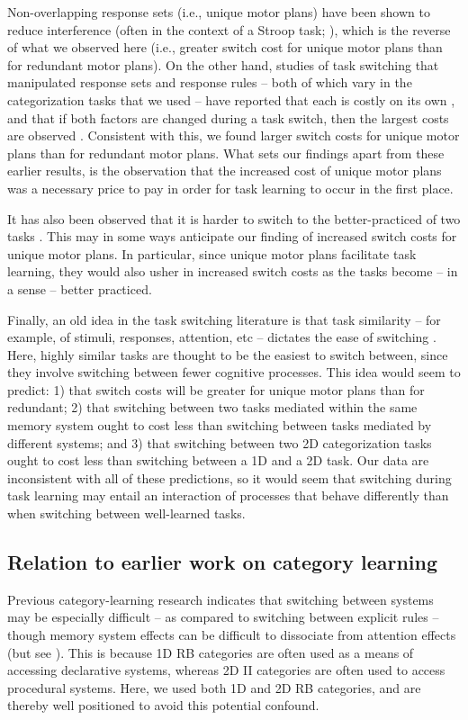 \documentclass[doc, floatsintext]{apa7}
\begin{document}
Non-overlapping response sets (i.e., unique motor plans)
have been shown to reduce interference (often in the context
of a Stroop task; \cite{klein_semantic_1964, mayr_age_2001,
redding_stroop_1977, yeung_switching_2003}), which is the
reverse of what we observed here (i.e., greater switch cost
for unique motor plans than for redundant motor plans). On
the other hand, studies of task switching that manipulated
response sets and response rules -- both of which vary in
the categorization tasks that we used -- have reported that
each is costly on its own \parencite{philipp_role_2011,
philipp_differential_2013}, and that if both factors are
changed during a task switch, then the largest costs are
observed \parencite{philipp_integration_2010}. Consistent
with this, we found larger switch costs for unique motor
plans than for redundant motor plans. What sets our findings
apart from these earlier results, is the observation that
the increased cost of unique motor plans was a necessary
price to pay in order for task learning to occur in the
first place.

It has also been observed that it is harder to switch to the
better-practiced of two tasks
\parencite{allport_shifting_1994, yeung_switching_2003}.
This may in some ways anticipate our finding of increased
switch costs for unique motor plans. In particular, since
unique motor plans facilitate task learning, they would also
usher in increased switch costs as the tasks become -- in a
sense -- better practiced.

Finally, an old idea in the task switching literature is
that task similarity -- for example, of stimuli, responses,
attention, etc -- dictates the ease of switching
\parencite{arrington_tasks_2003}. Here, highly similar tasks
are thought to be the easiest to switch between, since they
involve switching between fewer cognitive processes.  This
idea would seem to predict: 1) that switch costs will be
greater for unique motor plans than for redundant; 2) that
switching between two tasks mediated within the same memory
system ought to cost less than switching between tasks
mediated by different systems; and 3) that switching between
two 2D categorization tasks ought to cost less than
switching between a 1D and a 2D task. Our data are
inconsistent with all of these predictions, so it would seem
that switching during task learning may entail an
interaction of processes that behave differently than when
switching between well-learned tasks.

\subsection{Relation to earlier work on category learning}
Previous category-learning research indicates that switching
between systems may be especially difficult -- as compared
to switching between explicit rules -- though memory system
effects can be difficult to dissociate from attention
effects (but see \cite{smith_implicit_2012,
ashby_dissociations_2020}). This is because 1D RB categories
are often used as a means of accessing declarative systems,
whereas 2D II categories are often used to access procedural
systems. Here, we used both 1D and 2D RB categories, and are
thereby well positioned to avoid this potential confound.
\end{document}
